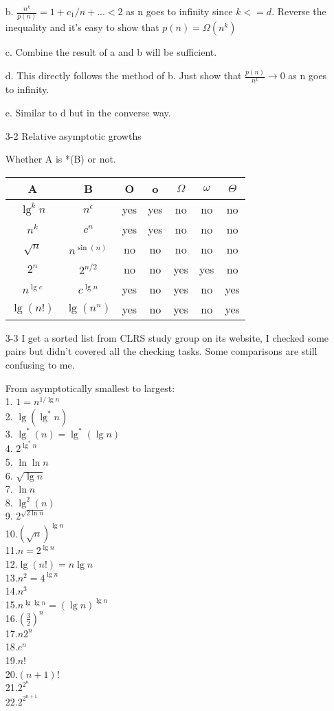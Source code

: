 \documentclass[]{article}
\begin{document}
\begin{enumerate}
b. $\frac{n^k}{p(n)} = 1 + c_1/n+... <2 $ as n goes to infinity since $k<=d$. Reverse the inequality and it's easy to show that $p(n)=\Omega(n^k)$

c. Combine the result of a and b will be sufficient.

d. This directly follows the method of b. Just show that $ \frac{p(n)}{n^k} \to 0 $ as n goes to infinity.

e. Similar to d but in the converse way.

\item[3-2] Relative asymptotic growths

Whether A is *(B) or not.\\
\begin{tabular}{|c|c|c|c|c|c|c|}
\hline
A & B & O & o & $ \Omega $ & $\omega$ & $ \Theta $\\
\hline
$\lg^k n$ & $n^{\epsilon} $ & yes & yes & no & no & no\\
\hline
$ n^k $ & $c^n$ & yes & yes & no & no & no\\
\hline
$\sqrt{n}$ & $ n^{\sin(n)} $ & no & no & no & no & no\\
\hline
$2^n$ & $ 2^{n/2} $ & no & no & yes & yes & no\\
\hline
$　n^{\lg c} $ & $ c^{\lg n} $ & yes & no & yes & no & yes\\
\hline
$ \lg(n!) $ & $\lg(n^n)$ & yes & no & yes & no & yes\\
\hline
\end{tabular}

\item[3-3] I get a sorted list from CLRS study group on its website, I checked some pairs but didn't covered all the checking tasks. Some comparisons are still confusing to me.

From asymptotically smallest to largest:\\
1. $ 1 = n^{1/\lg n} $\\
2. $ \lg(\lg^* n) $\\
3. $ \lg^*(n) = \lg^*(\lg n) $\\
4. $ 2^{\lg^* n} $\\
5. $ \ln \ln n $\\
6. $ \sqrt{\lg n} $\\
7. $ \ln n $\\
8. $ \lg^2(n) $\\
9. $ 2^{\sqrt{2\ln n}} $\\
10.$ (\sqrt{n})^{\lg n} $\\
11.$ n=2^{\lg n} $\\
12.$ \lg(n!) = n\lg n$\\
13.$ n^2 = 4^{\lg n}  $\\
14.$ n^3 $\\
15.$ n^{\lg \lg n} = (\lg n)^{\lg n} $\\
16.$ (\frac{3}{2})^{n} $\\
17.$ n2^n $\\
18.$ e^n $\\
19.$ n! $\\
20.$ (n+1)! $\\
21.$ 2^{2^{n}} $\\
22.$ 2^{2^{n+1}} $\\


\end{enumerate}
\end{document}
